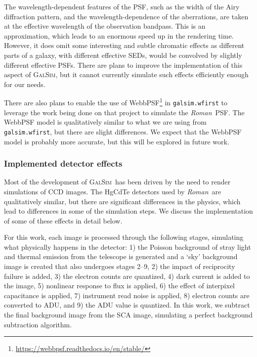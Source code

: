 \documentclass[usenatbib]{mnras}
\newcommand{\galsim}{\textsc{GalSim}}
\newcommand{\wfirst}{{\slshape Roman}}
\begin{document}
The wavelength-dependent features of the PSF, such as the width of the Airy diffraction pattern, and the wavelength-dependence of the aberrations, are taken at the effective wavelength of the observation bandpass.
This is an approximation, which leads to an enormous speed up in the rendering time.
However, it does omit some interesting and subtle chromatic effects as different parts of a galaxy, with different effective SEDs, would be convolved by slightly different effective PSFs.
There are plans to improve the implementation of this aspect of \galsim, but it cannot currently simulate such effects efficiently enough for our needs.

There are also plans to enable the use of WebbPSF\footnote{\url{https://webbpsf.readthedocs.io/en/stable/}} in \texttt{galsim.wfirst} to leverage the work being done on that project to simulate the \wfirst\ PSF.
The WebbPSF model is qualitatively similar to what we are using from \texttt{galsim.wfirst}, but there are slight differences.
We expect that the WebbPSF model is probably more accurate, but this will be explored in future work.

\subsubsection{Implemented detector effects}\label{effects}

Most of the development of \galsim\ has been driven by the need to render simulations of CCD images.
The HgCdTe detectors used by \wfirst\ are qualitatively similar, but there are significant differences in the physics, which lead to differences in some of the simulation steps. We discuss the implementation of some of these effects in detail below. 

For this work, each image is processed through the following stages, simulating what physically happens in the detector: 1) the Poisson background of stray light and thermal emission from the telescope is generated and a `sky' background image is created that also undergoes stages 2--9, 2) the impact of reciprocity failure is added, 3) the electron counts are quantized, 4) dark current is added to the image, 5) nonlinear response to flux is applied, 6) the effect of interpixel capacitance is applied, 7) instrument read noise is applied, 8) electron counts are converted to ADU, and 9) the ADU value is quantized. In this work, we subtract the final background image from the SCA image, simulating a perfect background subtraction algorithm.
\end{document}
